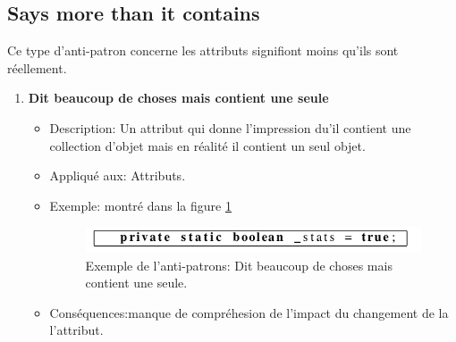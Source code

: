 \subsection{Says more than it contains}
Ce type d'anti-patron concerne les  attributs signifiont moins qu'ils sont réellement\cite{arnaoudova2013new}.
\begin{enumerate}
    
\item \textbf {Dit beaucoup de choses mais contient une seule}
\begin{itemize}
\item Description: Un attribut qui donne l’impression du’il contient une collection d’objet mais en réalité il contient un seul objet.
\item Appliqué aux: Attributs.
\item Exemple: montré dans la figure \ref{fig:cinq}
\begin{figure}[H]
	\centering
\includegraphics[width=0.9\linewidth]{Others/Resources/cinq.png}
	\caption{Exemple de l'anti-patrons: Dit beaucoup de choses mais contient une seule\cite{arnaoudova2013new}.}
		\label{fig:cinq}
	\end{figure}
\item Conséquences:manque de compréhesion de l’impact du changement de la l’attribut.
\end{itemize}
\end{enumerate}
